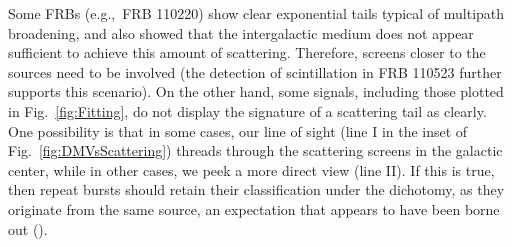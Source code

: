 \documentclass{aa}
\begin{document}
Some FRBs (e.g.,~FRB 110220) show clear exponential tails typical of multipath broadening, and \cite{2014ApJ...785L..26L} also showed that the intergalactic medium does not appear sufficient to achieve this amount of scattering. Therefore, screens closer to the sources need to be involved (the detection of scintillation in FRB 110523 further supports this scenario).  
On the other hand, some signals, including those plotted in Fig.~\ref{fig:Fitting}, do not display the signature of a scattering tail as clearly. One possibility is that in some cases, our line of sight (line I in the inset of Fig.~\ref{fig:DMVsScattering}) threads through the scattering screens in the galactic center, while in other cases, we peek a more direct view (line II). If this is true, then repeat bursts should retain their classification under the dichotomy, as they originate from the same source, an expectation that appears to have been borne out (\cite{Spitler:2016dmz,Scholz:2016rpt}). 
\end{document}
